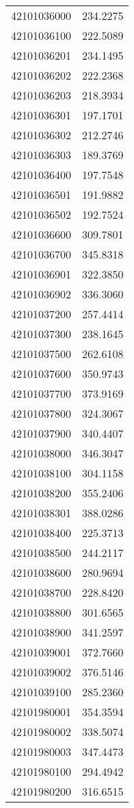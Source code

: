 \begin{longtable}[t]{lr}
42101036000 & 234.2275\\
42101036100 & 222.5089\\
42101036201 & 234.1495\\
42101036202 & 222.2368\\
42101036203 & 218.3934\\
42101036301 & 197.1701\\
42101036302 & 212.2746\\
42101036303 & 189.3769\\
42101036400 & 197.7548\\
42101036501 & 191.9882\\
42101036502 & 192.7524\\
42101036600 & 309.7801\\
42101036700 & 345.8318\\
42101036901 & 322.3850\\
42101036902 & 336.3060\\
42101037200 & 257.4414\\
42101037300 & 238.1645\\
42101037500 & 262.6108\\
42101037600 & 350.9743\\
42101037700 & 373.9169\\
42101037800 & 324.3067\\
42101037900 & 340.4407\\
42101038000 & 346.3047\\
42101038100 & 304.1158\\
42101038200 & 355.2406\\
42101038301 & 388.0286\\
42101038400 & 225.3713\\
42101038500 & 244.2117\\
42101038600 & 280.9694\\
42101038700 & 228.8420\\
42101038800 & 301.6565\\
42101038900 & 341.2597\\
42101039001 & 372.7660\\
42101039002 & 376.5146\\
42101039100 & 285.2360\\
42101980001 & 354.3594\\
42101980002 & 338.5074\\
42101980003 & 347.4473\\
42101980100 & 294.4942\\
42101980200 & 316.6515\\

\end{longtable}

